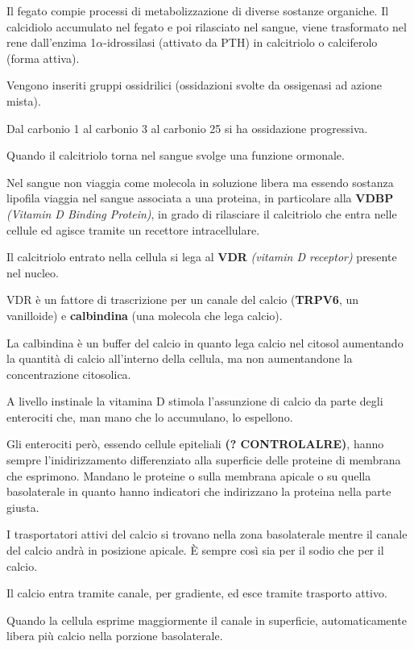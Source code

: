 \documentclass[]{article}
\begin{document}
Il fegato compie processi di metabolizzazione di diverse sostanze
organiche. Il calcidiolo accumulato nel fegato e poi rilasciato nel
sangue, viene trasformato nel rene dall'enzima 1\(\alpha\)-idrossilasi
(attivato da PTH) in calcitriolo o calciferolo (forma attiva).

Vengono inseriti gruppi ossidrilici (ossidazioni svolte da ossigenasi ad
azione mista).

Dal carbonio 1 al carbonio 3 al carbonio 25 si ha ossidazione
progressiva.

Quando il calcitriolo torna nel sangue svolge una funzione ormonale.

Nel sangue non viaggia come molecola in soluzione libera ma essendo
sostanza lipofila viaggia nel sangue associata a una proteina, in
particolare alla \textbf{VDBP} \emph{(Vitamin D Binding Protein)}, in
grado di rilasciare il calcitriolo che entra nelle cellule ed agisce
tramite un recettore intracellulare.

Il calcitriolo entrato nella cellula si lega al \textbf{VDR}
\emph{(vitamin D receptor)} presente nel nucleo.

VDR è un fattore di trascrizione per un canale del calcio
(\textbf{TRPV6}, un vanilloide) e \textbf{calbindina} (una molecola che
lega calcio).

La calbindina è un buffer del calcio in quanto lega calcio nel citosol
aumentando la quantità di calcio all'interno della cellula, ma non
aumentandone la concentrazione citosolica.

A livello instinale la vitamina D stimola l'assunzione di calcio da
parte degli enterociti che, man mano che lo accumulano, lo espellono.

Gli enterociti però, essendo cellule epiteliali \textbf{(?
CONTROLALRE)}, hanno sempre l'inidirizzamento differenziato alla
superficie delle proteine di membrana che esprimono. Mandano le proteine
o sulla membrana apicale o su quella basolaterale in quanto hanno
indicatori che indirizzano la proteina nella parte giusta.

I trasportatori attivi del calcio si trovano nella zona basolaterale
mentre il canale del calcio andrà in posizione apicale. È sempre così
sia per il sodio che per il calcio.

Il calcio entra tramite canale, per gradiente, ed esce tramite trasporto
attivo.

Quando la cellula esprime maggiormente il canale in superficie,
automaticamente libera più calcio nella porzione basolaterale.
\end{document}
